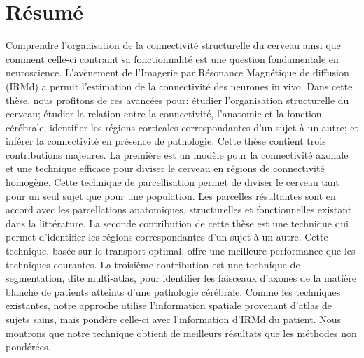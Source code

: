 \chapter{Résumé}
Comprendre l'organisation de la connectivité
structurelle du cerveau ainsi que comment celle-ci contraint sa fonctionnalité
est une question fondamentale en neuroscience. L'avènement de l'Imagerie par
Résonance Magnétique de diffusion (IRMd) a permit l'estimation de la connectivité
des neurones in vivo. Dans cette thèse, nous profitons de ces avancées pour:
étudier l'organisation structurelle du cerveau; étudier la relation entre la
connectivité, l'anatomie et la fonction cérébrale; identifier les régions
corticales correspondantes d'un sujet à un autre; et inférer la connectivité
en présence de pathologie. Cette thèse contient trois contributions majeures.
La première est un modèle pour la connectivité axonale et une technique efficace
pour diviser le cerveau en régions de connectivité homogène. Cette technique de
parcellisation permet de diviser le cerveau tant pour un seul sujet que pour une
population. Les parcelles résultantes sont en accord avec les parcellations
anatomiques, structurelles et fonctionnelles existant dans la littérature. 
La seconde contribution de cette thèse est une technique qui permet
d'identifier les régions correspondantes d'un sujet à un autre. Cette technique,
basée sur le transport optimal, offre une meilleure performance que les techniques
courantes. La troisième contribution est une technique de segmentation, dite
multi-atlas, pour identifier les faisceaux d'axones de la matière blanche de
patients atteints d'une pathologie cérébrale. Comme les techniques existantes,
notre approche utilise l'information spatiale provenant d'atlas de sujets sains,
mais pondère celle-ci avec l'information d'IRMd du patient. Nous montrons que
notre technique obtient de meilleurs résultats que les méthodes non pondérées.
